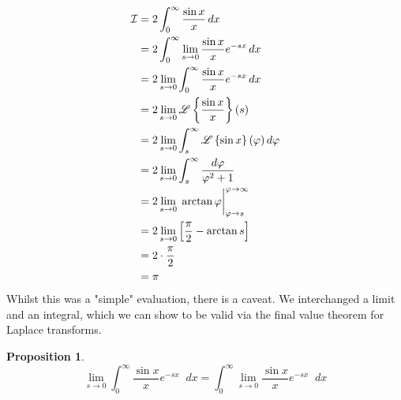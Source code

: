 \documentclass[a4paper]{article}
\newcommand*\diff{\mathop{}\!d} %
\newtheorem{proposition}[theorem]{Proposition}
\theoremstyle{definition}
\begin{document}
\begin{align*}
    \mathcal{I} & = 2\int_{0}^{\infty} \frac{\sin x}{x} \diff x                                                         \\
                & = 2 \int_{0}^{\infty} \lim_{s \to 0}\frac{\sin x}{x} e^{-sx} \diff x                                  \\
                & = 2 \lim_{s \to 0} \int_{0}^{\infty} \frac{\sin x}{x} e^{-sx} \diff x                                 \\
                & = 2 \lim_{s \to 0} \mathscr{L} \left\{\frac{\sin x}{x}\right\}(s)                                     \\
                & = 2 \lim_{s \to 0} \int_{s}^{\infty} \mathscr{L} \left\{\sin x\right\}(\varphi) \diff \varphi         \\
                & = 2 \lim_{s \to 0} \int_{s}^{\infty} \frac{\diff \varphi}{\varphi^2 + 1}                              \\
                & = 2 \lim_{s \to 0} \left.\vphantom{\int} \arctan \varphi \right|_{\varphi \to s}^{\varphi \to \infty} \\
                & = 2 \lim_{s \to 0} \left[\frac{\pi}{2} - \arctan s \right]                                            \\
                & = 2 \cdot \frac{\pi}{2}                                                                               \\
                & = \pi
\end{align*}
Whilst this was a "simple" evaluation, there is a caveat.
We interchanged a limit and an integral, which we can show to be valid via the final value theorem for Laplace transforms.
\begin{proposition} \label{thm:FVT proposition}
    \begin{equation*}
        \lim_{s \to 0} \int_{0}^{\infty} \frac{\sin x}{x} e^{-sx} \diff x = \int_{0}^{\infty} \lim_{s \to 0}\frac{\sin x}{x} e^{-sx} \diff x
    \end{equation*}
\end{proposition}
\end{document}
